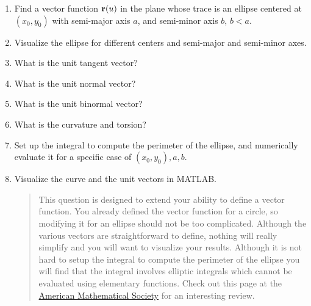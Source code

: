 \documentclass[M3_Night1_Solutions]{subfiles}
\begin{document}
\begin{enumerate}[series=exercises, label=\textbf{Exercise} (\arabic*)]
\item Find a vector function $\mathbf{r}(u)$ in the plane whose trace is an ellipse centered at $(x_0,y_0)$ with semi-major axis $a$, and semi-minor axis $b$, $b<a$. 
\be 
\item Visualize the ellipse for different centers and semi-major and semi-minor axes. 
\item What is the unit tangent vector? 
\item What is the unit normal vector? 
\item What is the unit binormal vector? 
\item What is the curvature and torsion? 
\item Set up the integral to compute the perimeter of the ellipse, and numerically evaluate it for a specific case of $(x_0,y_0), a, b$.
\item Visualize the curve and the unit vectors in MATLAB.
\ee
\begin{quote}
This question is designed to extend your ability to define a vector function. You already defined the vector function for a circle, so modifying it for an ellipse should not be too complicated. Although the various vectors are straightforward to define, nothing will really simplify and you will want to visualize your results. Although it is not hard to setup the integral to compute the perimeter of the ellipse you will find that the integral involves elliptic integrals which cannot be evaluated using elementary functions. Check out this page at the \href{http://www.ams.org/notices/201208/rtx120801094p.pdf}{American Mathematical Society} for an interesting review.
\end{quote}



\end{enumerate}
\end{document}
